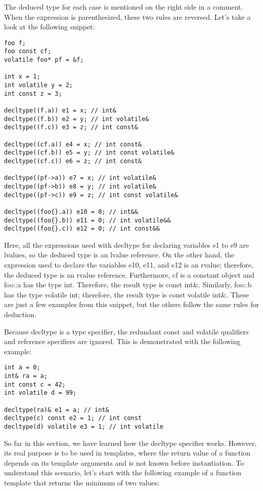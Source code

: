 The deduced type for each case is mentioned on the right side in a comment. When the expression is parenthesized, these two rules are reversed. Let’s take a look at the following snippet:

\begin{lstlisting}[style=styleCXX]
foo f;
foo const cf;
volatile foo* pf = &f;

int x = 1;
int volatile y = 2;
int const z = 3;

decltype((f.a)) e1 = x; // int&
decltype((f.b)) e2 = y; // int volatile&
decltype((f.c)) e3 = z; // int const&

decltype((cf.a)) e4 = x; // int const&
decltype((cf.b)) e5 = y; // int const volatile&
decltype((cf.c)) e6 = z; // int const&

decltype((pf->a)) e7 = x; // int volatile&
decltype((pf->b)) e8 = y; // int volatile&
decltype((pf->c)) e9 = z; // int const volatile&

decltype((foo{}.a)) e10 = 0; // int&&
decltype((foo{}.b)) e11 = 0; // int volatile&&
decltype((foo{}.c)) e12 = 0; // int const&&
\end{lstlisting}

Here, all the expressions used with decltype for declaring variables e1 to e9 are lvalues, so the deduced type is an lvalue reference. On the other hand, the expression used to declare the variables e10, e11, and e12 is an rvalue; therefore, the deduced type is an rvalue reference. Furthermore, cf is a constant object and foo::a has the type int. Therefore, the result type is const int\&. Similarly, foo::b has the type volatile int; therefore, the result type is const volatile int\&. These are just a few examples from this snippet, but the others follow the same rules for deduction.

Because decltype is a type specifier, the redundant const and volatile qualifiers and reference specifiers are ignored. This is demonstrated with the following example:

\begin{lstlisting}[style=styleCXX]
int a = 0;
int& ra = a;
int const c = 42;
int volatile d = 99;

decltype(ra)& e1 = a; // int&
decltype(c) const e2 = 1; // int const
decltype(d) volatile e3 = 1; // int volatile
\end{lstlisting}

So far in this section, we have learned how the decltype specifier works. However, its real purpose is to be used in templates, where the return value of a function depends on its template arguments and is not known before instantiation. To understand this scenario, let’s start with the following example of a function template that returns the minimum of two values:

